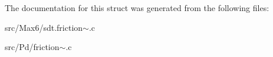 The documentation for this struct was generated from the following files\+:\begin{DoxyCompactItemize}
\item 
src/\+Max6/sdt.\+friction$\sim$.\+c\item 
src/\+Pd/friction$\sim$.\+c\end{DoxyCompactItemize}
